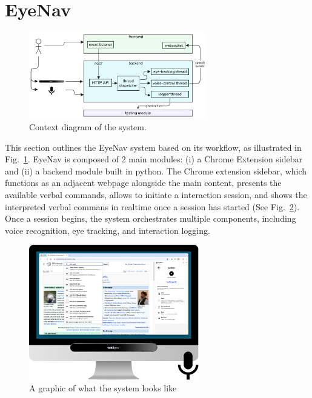 
\section{EyeNav}

\begin{figure}[h]
	\centering
	\includegraphics[width=220pt]{imgs/diagram-context.png}
	\caption{Context diagram of the system.}
	\label{fig:context}
\end{figure}

This section outlines the EyeNav system based on its workflow, as illustrated in Fig.~\ref{fig:context}. EyeNav is composed of 2 main modules: (i) a Chrome Extension sidebar and (ii) a backend module built in python. The Chrome extension sidebar, which functions as an adjacent webpage alongside the main content, presents the available verbal commands, allows to initiate a interaction session, and shows the interpreted verbal commans in realtime once a session has started (See Fig.~\ref{fig:requirements}). Once a session begins, the system orchestrates multiple components, including voice recognition, eye tracking, and interaction logging.

\begin{figure}[h]
	\centering
	\includegraphics[width=210pt]{imgs/system-requirements.png}
	\caption{A graphic of what the system looks like}
	\label{fig:requirements}
\end{figure}

